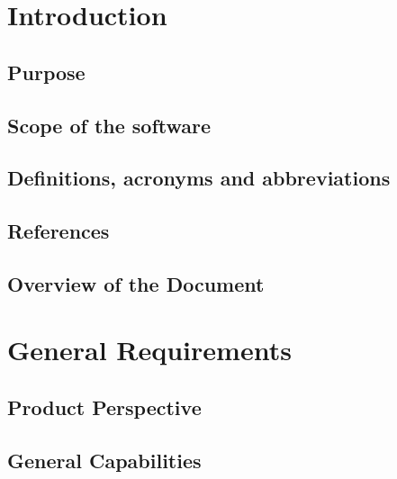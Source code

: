 \def\thedocument{User Requirements Document}
\def\thedate{DATE} %
\def\theversion{0.1}
\def\thestatus{Working copy}






\section{Introduction}
  \subsection{Purpose}
    

  \subsection{Scope of the software}
    

  \subsection{Definitions, acronyms and abbreviations}
    

  \subsection{References}
    

  \subsection{Overview of the Document}
    


\section{General Requirements}
  \subsection{Product Perspective}
    

  \subsection{General Capabilities}
    

